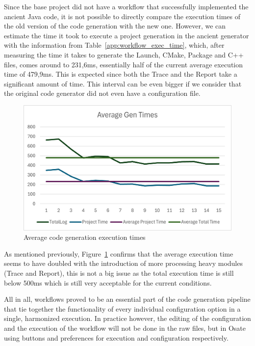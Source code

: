 Since the base project did not have a workflow that successfully implemented the ancient Java code, it is not possible to directly compare the execution times of the old version of the code generation with the new one. However, we can estimate the time it took to execute a project generation in the ancient generator with the information from Table~\ref{app:workflow_exec_time}, which, after measuring the time it takes to generate the Launch, CMake, Package and C++ files, comes around to 231,6ms, essentially half of the current average execution time of 479,9ms. This is expected since both the Trace and the Report take a significant amount of time. This interval can be even bigger if we consider that the original code generator did not even have a configuration file.

\begin{figure}[htbp]
	\centering
	\includegraphics[width=\textwidth]{avg_exec_times_1.png}
	\caption{Average code generation execution times}
	\label{fig:avg_exec_times_1}
\end{figure}

As mentioned previously, Figure~\ref{fig:avg_exec_times_1} confirms that the average execution time seems to have doubled with the introduction of more processing heavy modules (Trace and Report), this is not a big issue as the total execution time is still below 500ms which is still very acceptable for the current conditions.

All in all, workflows proved to be an essential part of the code generation pipeline that tie together the functionality of every individual configuration option in a single, harmonized execution. In practice however, the editing of the configuration and the execution of the workflow will not be done in the raw files, but in Osate using buttons and preferences for execution and configuration respectively.




